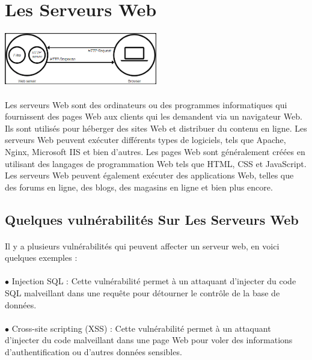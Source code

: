   
\section{Les Serveurs Web}
\vspace{4mm}
\paragraph{
	\includegraphics[width=0.5\textwidth]{Server_web.png}}
\paragraph{ }
Les serveurs Web sont des ordinateurs ou des programmes informatiques qui fournissent des pages Web aux clients qui les demandent via un navigateur Web. Ils sont utilisés pour héberger des sites Web et distribuer du contenu en ligne. Les serveurs Web peuvent exécuter différents types de logiciels, tels que Apache, Nginx, Microsoft IIS et bien d'autres. Les pages Web sont généralement créées en utilisant des langages de programmation Web tels que HTML, CSS et JavaScript. Les serveurs Web peuvent également exécuter des applications Web, telles que des forums en ligne, des blogs, des magasins en ligne et bien plus encore.

\subsection{Quelques vulnérabilités Sur Les Serveurs Web }
\paragraph{ }
Il y a plusieurs vulnérabilités qui peuvent affecter un serveur web, en voici quelques exemples :
\paragraph{ }
$\bullet$ Injection SQL : Cette vulnérabilité permet à un attaquant d'injecter du code SQL malveillant dans une requête pour détourner le contrôle de la base de données.
\paragraph{ }
$\bullet$ Cross-site scripting (XSS) : Cette vulnérabilité permet à un attaquant d'injecter du code malveillant dans une page Web pour voler des informations d'authentification ou d'autres données sensibles.
